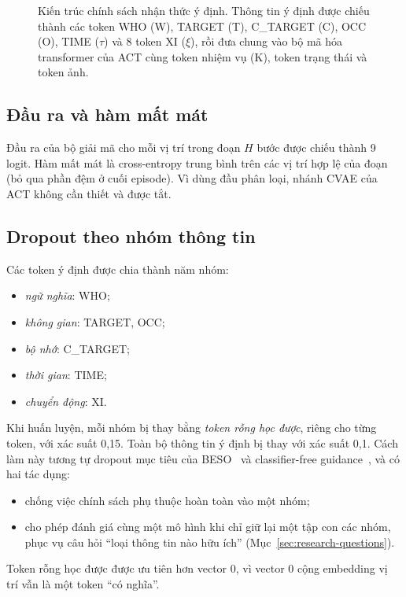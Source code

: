 \begin{figure}[htbp]
{}
  \caption{Kiến trúc chính sách nhận thức ý định. Thông tin ý định được chiếu thành các token WHO (W), TARGET (T), C\_TARGET (C), OCC (O), TIME ($\tau$) và 8 token XI ($\xi$), rồi đưa chung vào bộ mã hóa transformer của ACT cùng token nhiệm vụ (K), token trạng thái và token ảnh.}
  \label{fig:intent-act}
\end{figure}

\subsection{Đầu ra và hàm mất mát}

Đầu ra của bộ giải mã cho mỗi vị trí trong đoạn $H$ bước được chiếu thành 9 logit. Hàm mất mát là cross-entropy trung bình trên các vị trí hợp lệ của đoạn (bỏ qua phần đệm ở cuối episode). Vì dùng đầu phân loại, nhánh CVAE của ACT không cần thiết và được tắt.

\subsection{Dropout theo nhóm thông tin}
\label{sec:group-dropout}

Các token ý định được chia thành năm nhóm:
\begin{itemize}
  \item \emph{ngữ nghĩa}: WHO;
  \item \emph{không gian}: TARGET, OCC;
  \item \emph{bộ nhớ}: C\_TARGET;
  \item \emph{thời gian}: TIME;
  \item \emph{chuyển động}: XI.
\end{itemize}
Khi huấn luyện, mỗi nhóm bị thay bằng \emph{token rỗng học được}, riêng cho từng token, với xác suất 0,15. Toàn bộ thông tin ý định bị thay với xác suất 0,1. Cách làm này tương tự dropout mục tiêu của BESO~\cite{reuss2023beso} và classifier-free guidance~\cite{ho2022cfg}, và có hai tác dụng:
\begin{itemize}
  \item chống việc chính sách phụ thuộc hoàn toàn vào một nhóm;
  \item cho phép đánh giá cùng một mô hình khi chỉ giữ lại một tập con các nhóm, phục vụ câu hỏi ``loại thông tin nào hữu ích'' (Mục~\ref{sec:research-questions}).
\end{itemize}
Token rỗng học được được ưu tiên hơn vector 0, vì vector 0 cộng embedding vị trí vẫn là một token ``có nghĩa''.

